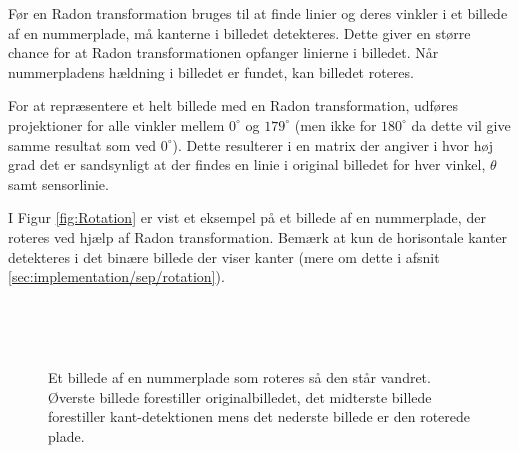 Før en Radon transformation bruges til at finde linier og deres vinkler i et billede af en nummerplade, må kanterne i billedet detekteres. Dette giver en større chance for at Radon transformationen opfanger linierne i billedet. Når nummerpladens hældning i billedet er fundet, kan billedet roteres.

For at repræsentere et helt billede med en Radon transformation, udføres projektioner for alle vinkler mellem $0^{\circ}$ og $179^{\circ}$ (men ikke for $180^{\circ}$ da dette vil give samme resultat som ved $0^{\circ}$). Dette resulterer i en matrix der angiver i hvor høj grad det er sandsynligt at der findes en linie i original billedet for hver vinkel, $\theta$ samt sensorlinie. %


I Figur \vref{fig:Rotation} er vist et eksempel på et billede af en nummerplade, der roteres ved hjælp af Radon transformation. Bemærk at kun de horisontale kanter detekteres i det binære billede der viser kanter (mere om dette i afsnit \vref{sec:implementation/sep/rotation}).

\begin{figure}[htp]
  \centering
  \begin{minipage}[c]{6 cm}
  \end{minipage}\\
  \begin{minipage}[c]{6 cm}
  \end{minipage}\\
  \begin{minipage}[c]{6 cm}
  \end{minipage}
  \caption{Et billede af en nummerplade som roteres så den står vandret. Øverste billede forestiller originalbilledet, det midterste billede forestiller kant-detektionen mens det nederste billede er den roterede plade.}
  \label{fig:Rotation}
\end{figure}



